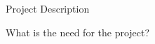 
\begin{subsection}{Project Description}

\end{subsection}


\begin{subsection}{What is the need for the project?}

\end{subsection}
